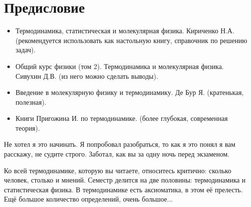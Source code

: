 \documentclass[../main.tex]{subfiles}
\begin{document}
\section*{Предисловие}
\begin{itemize}
    \item Термодинамика, статистическая и молекулярная физика. Кириченко Н.А. (рекомендуется использовать как настольную книгу, справочник по решению задач).
    \item Общий курс физики (том 2). Термодинамика и молекулярная физика. Сивухин Д.В. (из него можно сделать выводы).
    \item Введение в молекулярную физику и термодинамику. Де Бур Я. (кратенькая, полезная).
    \item Книги Пригожина И. по термодинамике. (более глубокая, современная теория).
\end{itemize}
Не хотел я это начинать. Я попробовал разобраться, то как я это понял я вам расскажу, не судите строго. Заботал, как вы за одну ночь перед экзаменом.

Ко всей термодинамике, которую вы читаете, относитесь критично: сколько человек, столько и мнений.
Семестр делится на две половины: термодинамика и статистическая физика. В термодинамике есть аксиоматика, в этом её прелесть. Ещё большое количество определений, очень большое...
\end{document}
